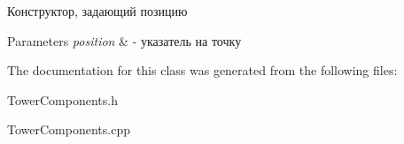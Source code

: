 Конструктор, задающий позицию 


\begin{DoxyParams}{Parameters}
{\em position} & -\/ указатель на точку \\
\hline
\end{DoxyParams}


The documentation for this class was generated from the following files\+:\begin{DoxyCompactItemize}
\item 
Tower\+Components.\+h\item 
Tower\+Components.\+cpp\end{DoxyCompactItemize}

